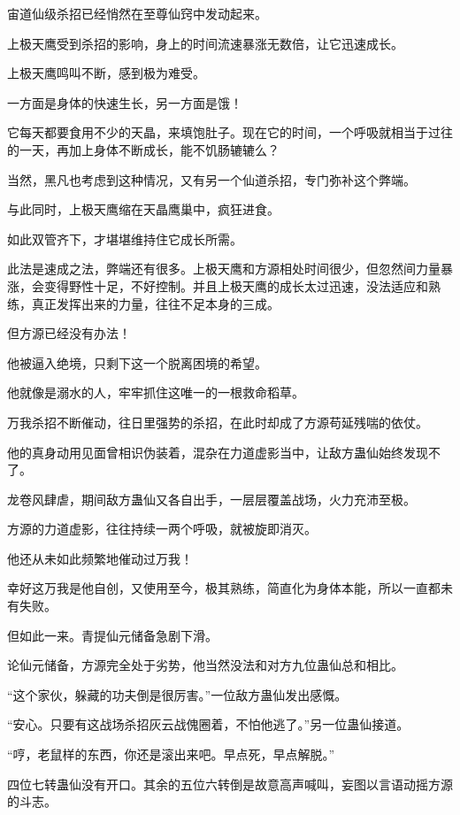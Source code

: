 
\begin{this_body}

宙道仙级杀招已经悄然在至尊仙窍中发动起来。

上极天鹰受到杀招的影响，身上的时间流速暴涨无数倍，让它迅速成长。

上极天鹰鸣叫不断，感到极为难受。

一方面是身体的快速生长，另一方面是饿！

它每天都要食用不少的天晶，来填饱肚子。现在它的时间，一个呼吸就相当于过往的一天，再加上身体不断成长，能不饥肠辘辘么？

当然，黑凡也考虑到这种情况，又有另一个仙道杀招，专门弥补这个弊端。

与此同时，上极天鹰缩在天晶鹰巢中，疯狂进食。

如此双管齐下，才堪堪维持住它成长所需。

此法是速成之法，弊端还有很多。上极天鹰和方源相处时间很少，但忽然间力量暴涨，会变得野性十足，不好控制。并且上极天鹰的成长太过迅速，没法适应和熟练，真正发挥出来的力量，往往不足本身的三成。

但方源已经没有办法！

他被逼入绝境，只剩下这一个脱离困境的希望。

他就像是溺水的人，牢牢抓住这唯一的一根救命稻草。

万我杀招不断催动，往日里强势的杀招，在此时却成了方源苟延残喘的依仗。

他的真身动用见面曾相识伪装着，混杂在力道虚影当中，让敌方蛊仙始终发现不了。

龙卷风肆虐，期间敌方蛊仙又各自出手，一层层覆盖战场，火力充沛至极。

方源的力道虚影，往往持续一两个呼吸，就被旋即消灭。

他还从未如此频繁地催动过万我！

幸好这万我是他自创，又使用至今，极其熟练，简直化为身体本能，所以一直都未有失败。

但如此一来。青提仙元储备急剧下滑。

论仙元储备，方源完全处于劣势，他当然没法和对方九位蛊仙总和相比。

“这个家伙，躲藏的功夫倒是很厉害。”一位敌方蛊仙发出感慨。

“安心。只要有这战场杀招灰云战傀圈着，不怕他逃了。”另一位蛊仙接道。

“哼，老鼠样的东西，你还是滚出来吧。早点死，早点解脱。”

四位七转蛊仙没有开口。其余的五位六转倒是故意高声喊叫，妄图以言语动摇方源的斗志。


\end{this_body}
